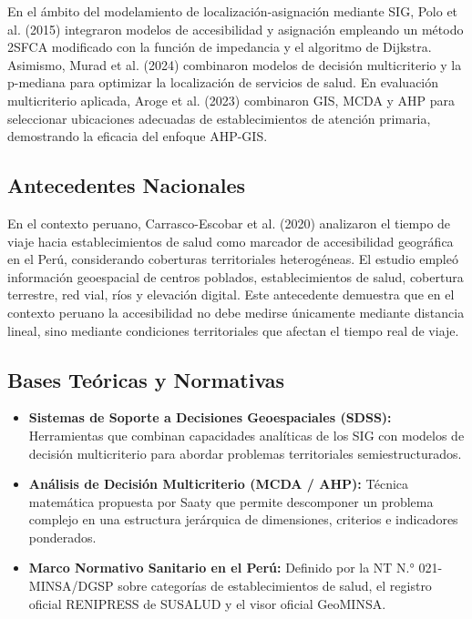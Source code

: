 \documentclass[12pt,a4paper,oneside]{article}
\begin{document}
En el ámbito del modelamiento de localización-asignación mediante SIG, Polo et al. (2015) integraron modelos de accesibilidad y asignación empleando un método 2SFCA modificado con la función de impedancia y el algoritmo de Dijkstra. Asimismo, Murad et al. (2024) combinaron modelos de decisión multicriterio y la p-mediana para optimizar la localización de servicios de salud. En evaluación multicriterio aplicada, Aroge et al. (2023) combinaron GIS, MCDA y AHP para seleccionar ubicaciones adecuadas de establecimientos de atención primaria, demostrando la eficacia del enfoque AHP-GIS.

\subsection{Antecedentes Nacionales}
En el contexto peruano, Carrasco-Escobar et al. (2020) analizaron el tiempo de viaje hacia establecimientos de salud como marcador de accesibilidad geográfica en el Perú, considerando coberturas territoriales heterogéneas. El estudio empleó información geoespacial de centros poblados, establecimientos de salud, cobertura terrestre, red vial, ríos y elevación digital. Este antecedente demuestra que en el contexto peruano la accesibilidad no debe medirse únicamente mediante distancia lineal, sino mediante condiciones territoriales que afectan el tiempo real de viaje.

\subsection{Bases Teóricas y Normativas}
\begin{itemize}
    \item \textbf{Sistemas de Soporte a Decisiones Geoespaciales (SDSS):} Herramientas que combinan capacidades analíticas de los SIG con modelos de decisión multicriterio para abordar problemas territoriales semiestructurados.
    \item \textbf{Análisis de Decisión Multicriterio (MCDA / AHP):} Técnica matemática propuesta por Saaty que permite descomponer un problema complejo en una estructura jerárquica de dimensiones, criterios e indicadores ponderados.
    \item \textbf{Marco Normativo Sanitario en el Perú:} Definido por la NT N.° 021-MINSA/DGSP sobre categorías de establecimientos de salud, el registro oficial RENIPRESS de SUSALUD y el visor oficial GeoMINSA.
\end{itemize}

\newpage
\end{document}
